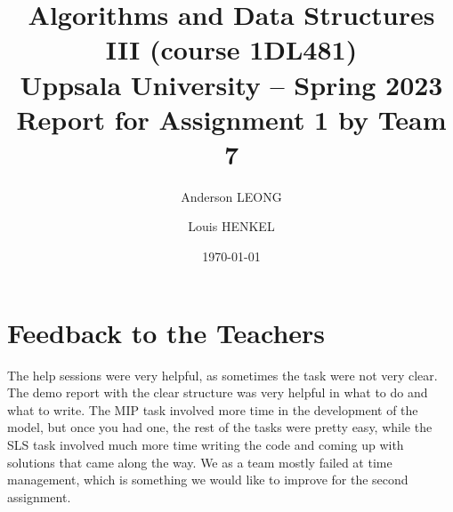\documentclass[a4paper,11pt,hidelinks]{article}
\title{\textbf{Algorithms and Data Structures III (course 1DL481) \\
    Uppsala University -- Spring 2023 \\
    Report for Assignment 1  %
    by Team 7}}              %
\author{Anderson LEONG \and Louis HENKEL}
\date{\today}
\newcommand{\todo}[1]{{\color{blue}#1}}  %
\begin{document}
\maketitle


  



\clearpage


% 

% 

\clearpage
\section*{Feedback to the Teachers}

The help sessions were very helpful, as sometimes the task were not very clear. The demo report with the clear structure was very helpful in what to do and what to write. The MIP task involved more time in the development of the model, but once you had one, the rest of the tasks were pretty easy, while the SLS task involved much more time writing the code and coming up with solutions that came along the way. We as a team mostly failed at time management, which is something we would like to improve for the second assignment. 




\todo{}
\end{document}
